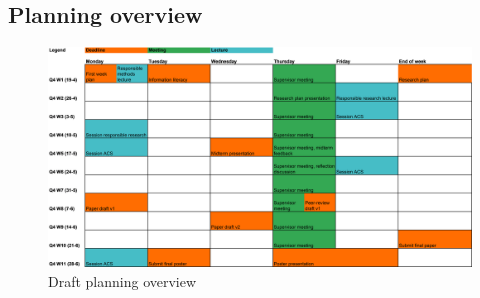 \documentclass[english]{article}
\begin{document}
\pagebreak
\subsection*{Planning overview}
\begin{figure}[h]
	\includegraphics[width=\linewidth]{Planning}
	\centering
	\caption{Draft planning overview}
\end{figure}


\printbibliography

\end{document}
